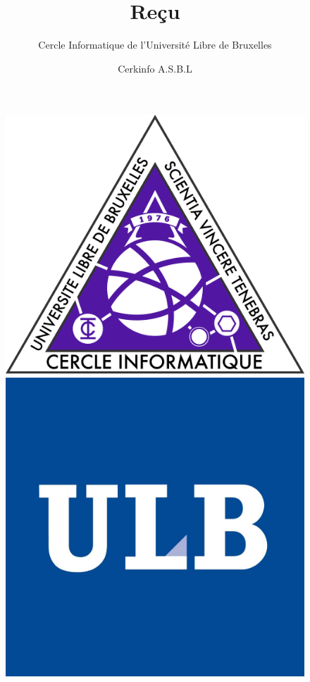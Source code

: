 \documentclass{article}
\title{Reçu}
\author{Cercle Informatique de l'Université Libre de Bruxelles}
\date{Cerkinfo A.S.B.L}
\begin{document}
\thispagestyle{empty}
\begin{figure}
	\includegraphics[scale=0.025]{ci.png}
	\hfill
	\includegraphics[scale=0.35]{ulb.png}
  \label{fig:ci}
\end{figure}
\vspace{-5cm}
\maketitle
\end{document}
